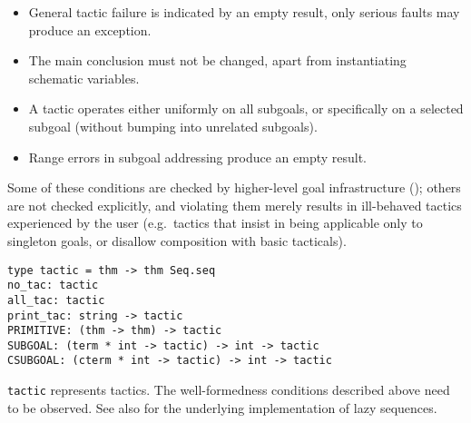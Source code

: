 \begin{isabellebody}
\begin{isamarkuptext}
\begin{itemize}
  \item General tactic failure is indicated by an empty result, only
  serious faults may produce an exception.

  \item The main conclusion must not be changed, apart from
  instantiating schematic variables.

  \item A tactic operates either uniformly on all subgoals, or
  specifically on a selected subgoal (without bumping into unrelated
  subgoals).

  \item Range errors in subgoal addressing produce an empty result.

  \end{itemize}

  Some of these conditions are checked by higher-level goal
  infrastructure (); others are not checked
  explicitly, and violating them merely results in ill-behaved tactics
  experienced by the user (e.g.\ tactics that insist in being
  applicable only to singleton goals, or disallow composition with
  basic tacticals).%
\end{isamarkuptext}%
\isamarkuptrue%
%
\isadelimmlref
%
\endisadelimmlref
%
\isatagmlref
%
\begin{isamarkuptext}%
\begin{mldecls}
  \verb|type tactic = thm -> thm Seq.seq| \\
  \verb|no_tac: tactic| \\
  \verb|all_tac: tactic| \\
  \verb|print_tac: string -> tactic| \\[1ex]
  \verb|PRIMITIVE: (thm -> thm) -> tactic| \\[1ex]
  \verb|SUBGOAL: (term * int -> tactic) -> int -> tactic| \\
  \verb|CSUBGOAL: (cterm * int -> tactic) -> int -> tactic| \\
  \end{mldecls}

  \begin{description}

  \item \verb|tactic| represents tactics.  The well-formedness
  conditions described above need to be observed.  See also \hyperlink{file.~~/src/Pure/General/seq.ML}{\mbox{}} for the underlying implementation of
  lazy sequences.


\end{description}
\end{isamarkuptext}
\end{isabellebody}

